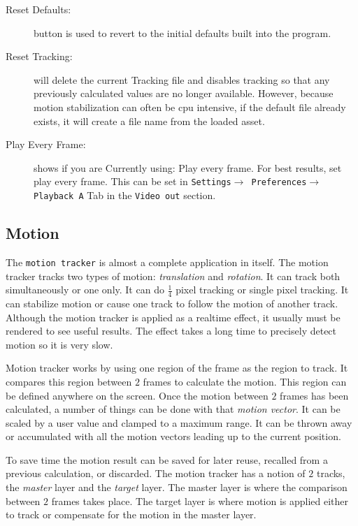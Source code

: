 \begin{description}
    \item[Reset Defaults:] button is used to revert to the initial defaults built into the program.
    \item[Reset Tracking:] will delete the current Tracking file and disables tracking so that any previously calculated values are no longer available. However, because motion stabilization can often be cpu intensive, if the default file already exists, it will create a file name from the loaded asset.
    \item[Play Every Frame:] shows if you are Currently using: Play every frame. For best results, set play every frame. This can be set in \texttt{Settings$\rightarrow$ Preferences$\rightarrow$ Playback A} Tab in the \texttt{Video out} section.
\end{description}

\subsection{Motion}%
\label{sub:motion}

The \texttt{motion tracker} is almost a complete application in itself. The motion tracker tracks two types of motion: \textit{translation} and \textit{rotation}. It can track both simultaneously or one only. It can do $\frac{1}{4}$ pixel tracking or single pixel tracking. It can stabilize motion or cause one track to follow the motion of another track. Although the motion tracker is applied as a realtime effect, it usually must be rendered to see useful results. The effect takes a long time to precisely detect motion so it is very slow.

Motion tracker works by using one region of the frame as the region to track. It compares this region between $2$ frames to calculate the motion. This region can be defined anywhere on the screen. Once the motion between $2$ frames has been calculated, a number of things can be done with that \textit{motion vector}. It can be scaled by a user value and clamped to a maximum range. It can be thrown away or accumulated with all the motion vectors leading up to the current position.

To save time the motion result can be saved for later reuse, recalled from a previous calculation, or discarded. The motion tracker has a notion of $2$ tracks, the \textit{master} layer and the \textit{target} layer. The master layer is where the comparison between $2$ frames takes place. The target layer is where motion is applied either to track or compensate for the motion in the master layer.


